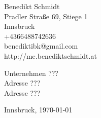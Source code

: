 


\begin{flushleft}
Benedikt Schmidt \\
Pradler Straße 69, Stiege 1 \\
Innsbruck \\
+4366488742636 \\
benediktibk@gmail.com \\
http://me.benediktschmidt.at \\
\end{flushleft}
\begin{flushleft}
Unternehmen ??? \\
Adresse ??? \\
Adresse ??? \\
\end{flushleft}
\begin{flushright}
Innsbruck, \today
\end{flushright}

